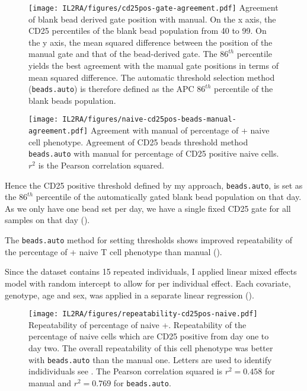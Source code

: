 \begin{figure}[h]
\centering
  \texttt{[image: IL2RA/figures/cd25pos-gate-agreement.pdf]}
{ Agreement of blank bead derived gate position with manual. }
{
On the x axis, the CD25 percentiles of the blank bead population from 40 to 99.
On the y axis, the mean squared difference between the position of the manual gate and that of the bead-derived gate.
The $86^{th}$ percentile yields the best agreement with the manual gate positions in terms of mean squared difference.
The automatic threshold selection method (\texttt{beads.auto}) is therefore defined as the APC $86^{th}$ percentile of the blank beads population.
}
\end{figure}

\begin{figure}[h]
\centering
\texttt{[image: IL2RA/figures/naive-cd25pos-beads-manual-agreement.pdf]}
{ Agreement with manual of percentage of + naive cell phenotype. }
{
Agreement of CD25 beads threshold method \texttt{beads.auto} with manual for percentage of CD25 positive naive cells.
$r^2$ is the Pearson correlation squared.
}
\end{figure}

Hence the CD25 positive threshold defined by my approach, \texttt{beads.auto}, is set as the $86^{th}$ percentile of the automatically gated blank bead population on that day.
As we only have one bead set per day, we have a single fixed CD25 gate for all samples on that day ().

The \texttt{beads.auto} method for setting  thresholds  shows improved repeatability of the percentage of + naive T cell phenotype
than manual ().  

Since the dataset contains 15 repeated individuals, I applied linear mixed effects model with random intercept to allow for per individual effect.
Each covariate, genotype, age and sex, was applied in a separate linear regression
().


\begin{figure}[h]
\centering
\texttt{[image: IL2RA/figures/repeatability-cd25pos-naive.pdf]}
{Repeatability of percentage of naive +.}
{
Repeatability of the percentage of naive cells which are CD25 positive from day one to day two.
The overall repeatability of this cell phenotype was better with \texttt{beads.auto} than the manual one.
Letters are used to identify indidividuals see .
The Pearson correlation squared is $r^2=0.458$ for manual and $r^2=0.769$ for \texttt{beads.auto}.
}
\end{figure}

